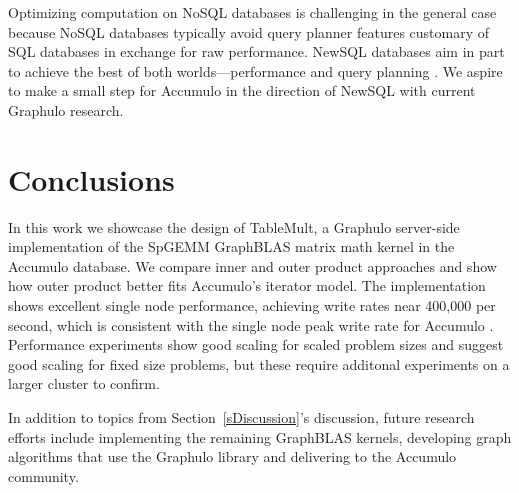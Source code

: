 Optimizing computation on NoSQL databases is challenging in the general case because
NoSQL databases typically avoid query planner features 
customary of SQL databases in exchange for raw performance.
NewSQL databases aim in part to achieve the best of both worlds---performance and query planning \cite{grolinger2013data}.
We aspire to make a small step for Accumulo in the direction of NewSQL with current Graphulo research.






\section{Conclusions}
\label{sConclusions}

In this work we showcase the design of TableMult, a Graphulo server-side implementation of the 
SpGEMM GraphBLAS matrix math kernel in the Accumulo database.
We compare inner and outer product approaches and show how outer product 
better fits Accumulo's iterator model.  The implementation shows excellent single node performance, 
achieving write rates near 400,000 per second, 
which is consistent with the single node peak write rate for Accumulo \cite{kepner2014achieving}.
Performance experiments show good scaling for scaled problem sizes and suggest good scaling for fixed size problems,
but these require additonal experiments on a larger cluster to confirm.

In addition to topics from Section~\ref{sDiscussion}'s discussion, 
future research efforts include
implementing the remaining GraphBLAS kernels, 
developing graph algorithms that use the Graphulo library
and delivering to the Accumulo community.
